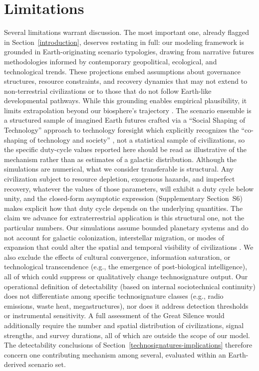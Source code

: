 \section{Limitations}\label{limitations}

Several limitations warrant discussion. The most important one, already flagged in Section~\ref{introduction}, deserves restating in full: our modeling framework is grounded in Earth-originating scenario typologies, drawing from narrative futures methodologies informed by contemporary geopolitical, ecological, and technological trends. These projections embed assumptions about governance structures, resource constraints, and recovery dynamics that may not extend to non-terrestrial civilizations or to those that do not follow Earth-like developmental pathways. While this grounding enables empirical plausibility, it limits extrapolation beyond our biosphere's trajectory \citep{Rubin2001-sk,Denning2011-fj}. The scenario ensemble is a structured sample of imagined Earth futures crafted via a ``Social Shaping of Technology'' approach to technology foresight which explicitly recognizes the ``co-shaping of technology and society'' \citep{Jorgensen2009-ss}, not a statistical sample of civilizations, so the specific duty-cycle values reported here should be read as illustrative of the mechanism rather than as estimates of a galactic distribution. Although the simulations are numerical, what we consider transferable is structural. Any civilization subject to resource depletion, exogenous hazards, and imperfect recovery, whatever the values of those parameters, will exhibit a duty cycle below unity, and the closed-form asymptotic expression (Supplementary Section~S6) makes explicit how that duty cycle depends on the underlying quantities. The claim we advance for extraterrestrial application is this structural one, not the particular numbers. Our simulations assume bounded planetary systems and do not account for galactic colonization, interstellar migration, or modes of expansion that could alter the spatial and temporal visibility of civilizations \citep{Walters1980-ev,Papagiannis1983-xv}. We also exclude the effects of cultural convergence, information saturation, or technological transcendence (e.g., the emergence of post-biological intelligence), all of which could suppress or qualitatively change technosignature output. Our operational definition of detectability (based on internal sociotechnical continuity) does not differentiate among specific technosignature classes (e.g., radio emissions, waste heat, megastructures), nor does it address detection thresholds or instrumental sensitivity. A full assessment of the Great Silence would additionally require the number and spatial distribution of civilizations, signal strengths, and survey durations, all of which are outside the scope of our model. The detectability conclusions of Section~\ref{technosignatures-implications} therefore concern one contributing mechanism among several, evaluated within an Earth-derived scenario set.

